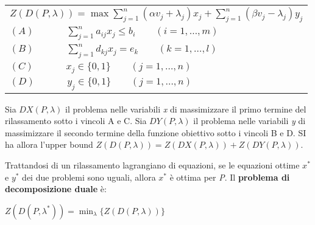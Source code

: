 \documentclass[11pt]{book}
\begin{document}
\begin{enumerate}
  \vspace{11pt}
  \begin{center}
    \begin{tabular}{l}
      $Z(D(P,\lambda)) = \max \sum \limits_{j=1}^n (\alpha v_j + \lambda_j) x_j +
      \sum\limits_{j=1}^n (\beta v_j - \lambda_j)y_j$\\
      $(A)\phantom{= max} \sum \limits_{j=1}^n a_{ij}x_j \leq b_i \qquad (i=1,\dots,m)$\\
      $(B)\phantom{= max} \sum \limits_{j=1}^n d_{kj}x_j = e_k \qquad (k=1,\dots,l)$\\
      $(C)\phantom{= max} x_j \in \{0,1\} \qquad (j=1,\dots,n)$\\
      $(D)\phantom{= max} y_j \in \{0,1\} \qquad (j=1,\dots,n)$\\
    \end{tabular}
  \end{center}
  \vspace{11pt}    
  
\end{enumerate}

Sia $DX(P,\lambda)$ il problema nelle variabili {\em x} di
massimizzare il primo termine del rilassamento sotto i vincoli A e
C. Sia $DY(P,\lambda)$ il problema nelle variabili {\em y} di
massimizzare il secondo termine della funzione obiettivo sotto i
vincoli B e D. SI ha allora l'upper bound $Z(D(P, \lambda)) = Z(DX(P,
\lambda)) + Z(DY(P, \lambda))$.

Trattandosi di un rilassamento lagrangiano di equazioni, se le
equazioni ottime $x^*$ e $y^*$ dei due problemi sono uguali, allora
$x^*$ \`e ottima per {\em P}. Il {\bf problema di decomposizione
  duale} \`e:

\begin{center}
$Z(D(P, \lambda^*)) = \min_\lambda\{ Z(D(P,\lambda)) \}$  
\end{center}
\end{document}
